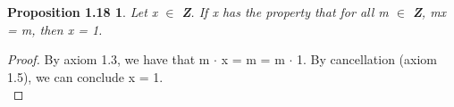 \documentclass[12pt]{amsart}
\begin{document}
\newtheorem*{prop1.18}{Proposition 1.18}
\begin{prop1.18}
	Let x $\in$ \textbf{Z}. If x has the property that for all m $\in$ \textbf{Z}, mx = m, then x = 1.
\end{prop1.18}

\begin{proof}
	By axiom 1.3, we have that m $\cdot$ x = m = m $\cdot$ 1. By cancellation (axiom 1.5), we can conclude x = 1.
	\\
\end{proof}
\end{document}
